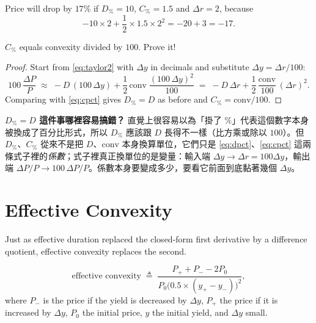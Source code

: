 \begin{eg}
	Price will drop by $17\%$ if $D_{\%}=10$, $C_{\%}=1.5$ and $\Delta r=2$, because
	\[
		-10\times 2 + \frac{1}{2}\times 1.5\times 2^{2} = -20 + 3 = -17 .
	\]
\end{eg}

\begin{exercise}
	$C_{\%}$ equals convexity divided by $100$. Prove it!
\end{exercise}

\suppstart
\begin{proof}
	Start from \eqref{eq:taylor2} with $\Delta y$ in decimals and substitute $\Delta y = \Delta r/100$:
	\[
		100\,\frac{\Delta P}{P}
		\;\approx\; -D\,(100\,\Delta y) + \frac{1}{2}\,\mathrm{conv}\;\frac{(100\,\Delta y)^{2}}{100}
		\;=\; -D\,\Delta r + \frac{1}{2}\,\frac{\mathrm{conv}}{100}\,(\Delta r)^{2} .
	\]
	Comparing with \eqref{eq:cpct} gives $D_{\%}=D$ as before and $C_{\%}=\mathrm{conv}/100$.
\end{proof}

\begin{remark}
	\textbf{$D_{\%}=D$ 這件事哪裡容易搞錯？} 直覺上很容易以為「掛了 $\%$」代表這個數字本身被換成了百分比形式，所以 $D_\%$ 應該跟 $D$ 長得不一樣（比方乘或除以 $100$）。但 $D_\%$、$C_\%$ 從來不是把 $D$、$\mathrm{conv}$ 本身換算單位，它們只是 \eqref{eq:dpct}、\eqref{eq:cpct} 這兩條式子裡的\emph{係數}；式子裡真正換單位的是變量：輸入端 $\Delta y\to\Delta r=100\Delta y$，輸出端 $\Delta P/P\to 100\,\Delta P/P$。係數本身要變成多少，要看它前面到底黏著幾個 $\Delta y$。
\end{remark}
\suppend

\section{Effective Convexity}
\label{sec:eff-conv}


Just as effective duration replaced the closed-form first derivative by a difference quotient, effective convexity replaces the second.

\begin{definition}
	\begin{equation}
		\text{effective convexity} \;\triangleq\; \frac{P_{+}+P_{-}-2P_{0}}{P_{0}\bigl(0.5\times(y_{+}-y_{-})\bigr)^{2}} , \label{eq:eff-conv}
	\end{equation}
	where $P_{-}$ is the price if the yield is decreased by $\Delta y$, $P_{+}$ the price if it is increased by $\Delta y$, $P_{0}$ the initial price, $y$ the initial yield, and $\Delta y$ small.
\end{definition}

